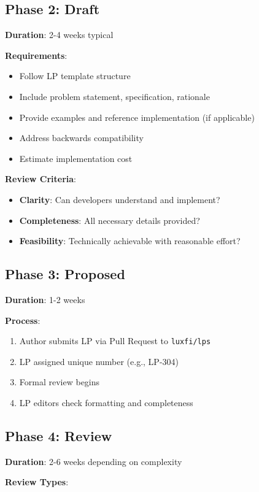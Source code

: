 \documentclass[11pt,a4paper]{article}
\begin{document}
\subsection{Phase 2: Draft}

\textbf{Duration}: 2-4 weeks typical

\textbf{Requirements}:
\begin{itemize}
\item Follow LP template structure
\item Include problem statement, specification, rationale
\item Provide examples and reference implementation (if applicable)
\item Address backwards compatibility
\item Estimate implementation cost
\end{itemize}

\textbf{Review Criteria}:
\begin{itemize}
\item \textbf{Clarity}: Can developers understand and implement?
\item \textbf{Completeness}: All necessary details provided?
\item \textbf{Feasibility}: Technically achievable with reasonable effort?
\end{itemize}

\subsection{Phase 3: Proposed}

\textbf{Duration}: 1-2 weeks

\textbf{Process}:
\begin{enumerate}
\item Author submits LP via Pull Request to \texttt{luxfi/lps}
\item LP assigned unique number (e.g., LP-304)
\item Formal review begins
\item LP editors check formatting and completeness
\end{enumerate}

\subsection{Phase 4: Review}

\textbf{Duration}: 2-6 weeks depending on complexity

\textbf{Review Types}:
\end{document}
